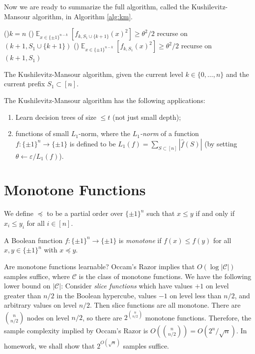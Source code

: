 \documentclass[letterpaper, reqno,11pt]{article}
\newcommand{\EE}{\mathop{{}\mathbb{E}}}
\begin{document}
Now we are ready to summarize the full algorithm, called the Kushilevitz-Mansour algorithm, in Algorithm \ref{alg:km}.

\begin{algorithm}
  \If(){$k = n$}{
  }
  \ElseIf(){$\EE_{x \in \{ \pm 1 \}^{n - k}}[f_{k, S_1 \cup \{ k + 1 \}}(x)^2] \geq \theta^2/2$}{
    recurse on $(k + 1, S_1 \cup \{ k + 1 \})$
  }
  \ElseIf(){$\EE_{x \in \{ \pm 1 \}^{n - k}}[f_{k, S_1}(x)^2] \geq \theta^2/2$}{
    recurse on $(k + 1, S_1)$
  }
  \caption{The Kushilevitz-Mansour algorithm, given the current level $k \in \{ 0, \ldots, n \}$ and the current prefix $S_1 \subset [n]$.}
  \label{alg:km}
\end{algorithm}

The Kushilevitz-Mansour algorithm has the following applications:
\begin{enumerate}[label=(\roman*), itemsep=0pt]
  \item Learn decision trees of size $\leq t$ (not just small depth);
  \item functions of small $L_1$-norm, where the \emph{$L_1$-norm} of a function $f : \{ \pm 1 \}^n \to \{ \pm 1 \}$ is defined to be $L_1(f) = \sum_{S \subset [n]} |\hat{f}(S)|$ (by setting $\theta \leftarrow \varepsilon/L_1(f)$).
\end{enumerate}

\section{Monotone Functions}

\begin{definition}
  We define $\preccurlyeq$ to be a partial order over $\{ \pm 1 \}^n$ such that $x \leq y$ if and only if $x_i \leq y_i$ for all $i \in [n]$.
\end{definition}

\begin{definition}
  A Boolean function $f : \{ \pm 1 \}^n \to \{ \pm 1 \}$ is \emph{monotone} if $f(x) \leq f(y)$ for all $x, y \in \{ \pm 1 \}^n$ with $x \preccurlyeq y$.
\end{definition}

Are monotone functions learnable? Occam's Razor implies that $O(\log|\mathcal C|)$ samples suffice, where $\mathcal C$ is the class of monotone functions. We have the following lower bound on $|\mathcal C|$: Consider \emph{slice functions} which have values $+ 1$ on level greater than $n/2$ in the Boolean hypercube, values $-1$ on level less than $n/2$, and arbitrary values on level $n/2$. Then slice functions are all monotone. There are $\binom{n}{n/2}$ nodes on level $n/2$, so there are $2^{\binom{n}{n/2}}$ monotone functions. Therefore, the sample complexity implied by Occam's Razor is $O(\binom{n}{n/2}) = O(2^n/\sqrt{n})$. In homework, we shall show that $2^{O(\sqrt{n})}$ samples suffice.
\end{document}
